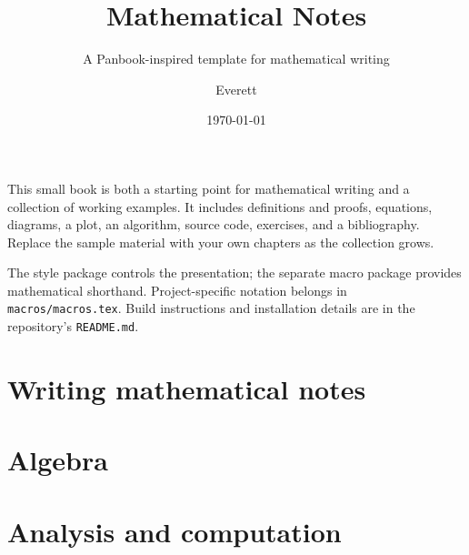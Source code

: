 \documentclass[10pt,a4paper,oneside]{scrbook}
\title{Mathematical Notes}
\subtitle{A Panbook-inspired template for mathematical writing}
\author{Everett}
\date{\today}
\begin{document}
\frontmatter
\makebooktitle

This small book is both a starting point for mathematical writing and a
collection of working examples. It includes definitions and proofs, equations,
diagrams, a plot, an algorithm, source code, exercises, and a bibliography.
Replace the sample material with your own chapters as the collection grows.

The style package controls the presentation; the separate macro package
provides mathematical shorthand. Project-specific notation belongs in
\texttt{macros/macros.tex}. Build instructions and installation details are in
the repository's \texttt{README.md}.

\begingroup
\small
\tableofcontents
\endgroup

\mainmatter
\part{Writing mathematical notes}
\parttoc


\part{Algebra}
\parttoc



\part{Analysis and computation}
\parttoc



\appendix


\backmatter
\printbibliography[heading=bibintoc,title={References},notkeyword=image]
\printbibliography[heading=bibintoc,title={Figure credits},keyword=image]
\end{document}
